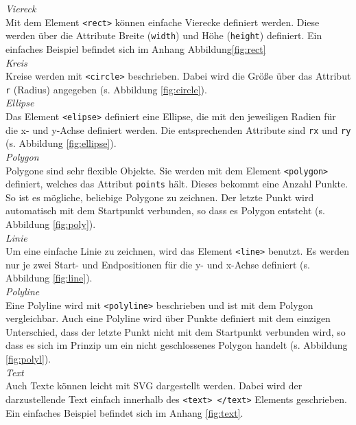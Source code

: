 \emph{Viereck}\\
Mit dem Element \texttt{<rect>} können einfache Vierecke definiert werden. Diese werden über die Attribute Breite (\texttt{width}) und Höhe (\texttt{height}) definiert. Ein einfaches Beispiel befindet sich im Anhang Abbildung\ref{fig:rect}\\

\emph{Kreis}\\
Kreise werden mit \texttt{<circle>} beschrieben. Dabei wird die Größe über das Attribut \texttt{r} (Radius) angegeben (s. Abbildung \ref{fig:circle}).\\

\emph{Ellipse}\\
Das Element \texttt{<elipse>} definiert eine Ellipse, die mit den jeweiligen Radien für die x- und y-Achse definiert werden. Die entsprechenden Attribute sind \texttt{rx} und \texttt{ry} (s. Abbildung \ref{fig:ellipse}).\\

\emph{Polygon}\\
Polygone sind sehr flexible Objekte. Sie werden mit dem Element \texttt{<polygon>} definiert, welches das Attribut \texttt{points} hält. Dieses bekommt eine Anzahl Punkte. So ist es mögliche, beliebige Polygone zu zeichnen. Der letzte Punkt wird automatisch mit dem Startpunkt verbunden, so dass es Polygon entsteht (s. Abbildung \ref{fig:poly}).\\

\emph{Linie}\\
Um eine einfache Linie zu zeichnen, wird das Element \texttt{<line>} benutzt. Es werden nur je zwei Start- und Endpositionen für die y- und x-Achse definiert (s. Abbildung \ref{fig:line}).\\

\emph{Polyline}\\
Eine Polyline wird mit \texttt{<polyline>} beschrieben und ist mit dem Polygon vergleichbar. Auch eine Polyline wird über Punkte definiert mit dem einzigen Unterschied, dass der letzte Punkt nicht mit dem Startpunkt verbunden wird, so dass es sich im Prinzip um ein nicht geschlossenes Polygon handelt (s. Abbildung \ref{fig:polyl}).\\

\emph{Text}\\
Auch Texte können leicht mit SVG dargestellt werden. Dabei wird der darzustellende Text einfach innerhalb des \texttt{<text> </text>} Elements geschrieben. Ein einfaches Beispiel befindet sich im Anhang \ref{fig:text}.

\newpage
